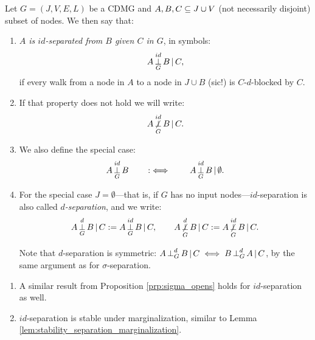 \begin{defmark}
\begin{Def}[$id$-separation]
    Let $G=(J,V,E,L)$ be a CDMG and $A,B,C \subseteq J \cup V$ (not necessarily disjoint) subset of nodes.
    We then say that:
    \begin{enumerate}
        \item \emph{$A$ is $id$-separated from $B$ given $C$ in $G$}, in symbols:
    \[ A \operatorname*{\perp}^{id}_G B \operatorname*{|} C,  \]
    if every walk from a node in $A$ to a node in $J \cup B$ (sic!) is $C$-$d$-blocked by $C$.
        \item If that property does not hold we will write:
            \[ A \operatorname*{\not\perp}^{id}_G B \operatorname*{|} C.\]
        \item We also define the special case:
                \[ A \operatorname*{\perp}^{id}_G B \qquad :\iff \qquad A \operatorname*{\perp}^{id}_G B \operatorname*{|} \emptyset.\]
        \item For the special case $J = \emptyset$---that is, if $G$ has no input nodes---$id$-separation is also called \emph{$d$-separation}, and we write:
          \[A \operatorname*{\perp}^d_G B \operatorname*{|} C := A \operatorname*{\perp}^{id}_G B \operatorname*{|} C, \qquad A \operatorname*{\not\perp}^d_G B \operatorname*{|} C := A \operatorname*{\not\perp}^{id}_G B \operatorname*{|} C.\]
          \begin{claimmark}
          Note that $d$-separation is symmetric: $A \operatorname*{\perp}^d_G B \operatorname*{|} C \iff B \operatorname*{\perp}^d_G A \operatorname*{|} C$, by the same argument as for $\sigma$-separation.
          \end{claimmark}
    \end{enumerate}
\end{Def}
\end{defmark}


\begin{claimmark}
\begin{Rem}
    \begin{enumerate}
        \item A similar result from Proposition \ref{prp:sigma_opens} holds for $id$-separation as well.
        \item $id$-separation is stable under marginalization, similar to Lemma \ref{lem:stability_separation_marginalization}.
    \end{enumerate}
\end{Rem}
\end{claimmark}



